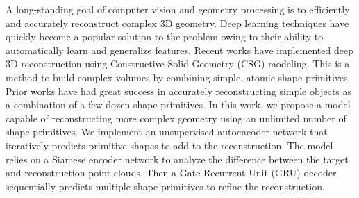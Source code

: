 A long-standing goal of computer vision and geometry processing is to efficiently and accurately reconstruct complex 3D geometry. Deep learning techniques have quickly become a popular solution to the problem owing to their ability to automatically learn and generalize features. Recent works have implemented deep 3D reconstruction using Constructive Solid Geometry (CSG) modeling. This is a method to build complex volumes by combining simple, atomic shape primitives. Prior works have had great success in accurately reconstructing simple objects as a combination of a few dozen shape primitives. In this work, we propose a model capable of reconstructing more complex geometry using an unlimited number of shape primitives. We implement an unsupervised autoencoder network that iteratively predicts primitive shapes to add to the reconstruction. The model relies on a Siamese encoder network to analyze the difference between the target and reconstruction point clouds. Then a Gate Recurrent Unit (GRU) decoder sequentially predicts multiple shape primitives to refine the reconstruction.

\vspace{1em}

